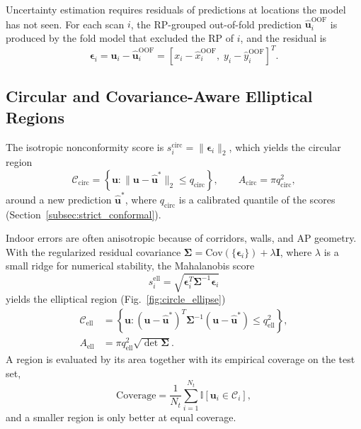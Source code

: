 Uncertainty estimation requires residuals of predictions at locations the model has not seen. For each scan $i$, the RP-grouped out-of-fold prediction $\hat{\mathbf{u}}_{i}^{\mathrm{OOF}}$ is produced by the fold model that excluded the RP of $i$, and the residual is
\begin{equation}
	\boldsymbol{\epsilon}_{i}
	=
	\mathbf{u}_{i}-\hat{\mathbf{u}}_{i}^{\mathrm{OOF}}
	=
	\left[x_i-\hat{x}_i^{\mathrm{OOF}},\;y_i-\hat{y}_i^{\mathrm{OOF}}\right]^{T}.
	\label{eq:oof_residual}
\end{equation}

\subsection{Circular and Covariance-Aware Elliptical Regions}
\label{subsec:circle_uncertainty}

The isotropic nonconformity score is $s_i^{\mathrm{circ}}=\|\boldsymbol{\epsilon}_{i}\|_{2}$, which yields the circular region
\begin{equation}
	\mathcal{C}_{\mathrm{circ}}
	=
	\left\{\mathbf{u}:\|\mathbf{u}-\hat{\mathbf{u}}^{*}\|_{2}\leq q_{\mathrm{circ}}\right\},
	\qquad
	A_{\mathrm{circ}}=\pi q_{\mathrm{circ}}^{2},
	\label{eq:circle_region}
\end{equation}
around a new prediction $\hat{\mathbf{u}}^{*}$, where $q_{\mathrm{circ}}$ is a calibrated quantile of the scores (Section~\ref{subsec:strict_conformal}).

Indoor errors are often anisotropic because of corridors, walls, and AP geometry. With the regularized residual covariance $\boldsymbol{\Sigma}=\mathrm{Cov}(\{\boldsymbol{\epsilon}_{i}\})+\lambda\mathbf{I}$, where $\lambda$ is a small ridge for numerical stability, the Mahalanobis score
\begin{equation}
	s_{i}^{\mathrm{ell}}
	=
	\sqrt{\boldsymbol{\epsilon}_{i}^{T}\boldsymbol{\Sigma}^{-1}\boldsymbol{\epsilon}_{i}}
	\label{eq:mahalanobis_score}
\end{equation}
yields the elliptical region (Fig.~\ref{fig:circle_ellipse})
\begin{align}
	\mathcal{C}_{\mathrm{ell}}
	&=
	\left\{\mathbf{u}:(\mathbf{u}-\hat{\mathbf{u}}^{*})^{T}\boldsymbol{\Sigma}^{-1}(\mathbf{u}-\hat{\mathbf{u}}^{*})\leq q_{\mathrm{ell}}^{2}\right\},
	\label{eq:ellipse_region}\\
	A_{\mathrm{ell}}
	&=
	\pi q_{\mathrm{ell}}^{2}\sqrt{\det\boldsymbol{\Sigma}}.
	\label{eq:ellipse_area}
\end{align}
A region is evaluated by its area together with its empirical coverage on the test set,
\begin{equation}
	\mathrm{Coverage}
	=
	\frac{1}{N_t}\sum_{i=1}^{N_t}\mathbb{I}\left[\mathbf{u}_{i}\in\mathcal{C}_{i}\right],
	\label{eq:coverage}
\end{equation}
and a smaller region is only better at equal coverage.


